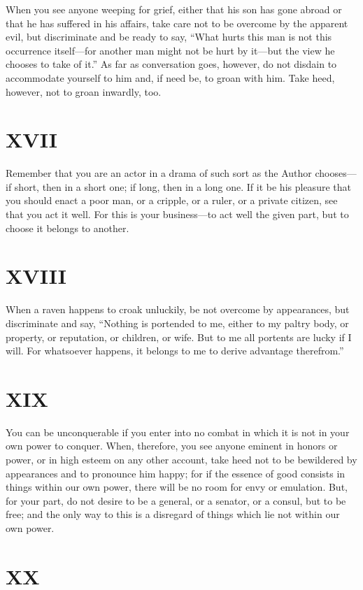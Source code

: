 \documentclass[11pt]{article}
\begin{document}
When you see anyone weeping for grief, either that his son has gone abroad or that he has suffered in his affairs, take care not to be overcome by the apparent evil, but discriminate and be ready to say, “What hurts this man is not this occurrence itself—for another man might not be hurt by it—but the view he chooses to take of it.” As far as conversation goes, however, do not disdain to accommodate yourself to him and, if need be, to groan with him. Take heed, however, not to groan inwardly, too.
\section*{XVII}

Remember that you are an actor in a drama of such sort as the Author chooses—if short, then in a short one; if long, then in a long one. If it be his pleasure that you should enact a poor man, or a cripple, or a ruler, or a private citizen, see that you act it well. For this is your business—to act well the given part, but to choose it belongs to another.
\section*{XVIII}

When a raven happens to croak unluckily, be not overcome by appearances, but discriminate and say, “Nothing is portended to me, either to my paltry body, or property, or reputation, or children, or wife. But to me all portents are lucky if I will. For whatsoever happens, it belongs to me to derive advantage therefrom.”
\section*{XIX}

You can be unconquerable if you enter into no combat in which it is not in your own power to conquer. When, therefore, you see anyone eminent in honors or power, or in high esteem on any other account, take heed not to be bewildered by appearances and to pronounce him happy; for if the essence of good consists in things within our own power, there will be no room for envy or emulation. But, for your part, do not desire to be a general, or a senator, or a consul, but to be free; and the only way to this is a disregard of things which lie not within our own power.
\section*{XX}
\end{document}

